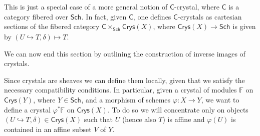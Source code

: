 \begin{rem}[]
	This is just a special case of a more general notion 
	of $\mathsf{C}$-crystal, where $\mathsf{C}$ is a category fibered over $\mathsf{Sch}_{  }$.
	In fact, given $\mathsf{C}$, one defines $\mathsf{C}$-crystals as cartesian
	sections of the fibered category $\mathsf{C} \times_{ \mathsf{Sch}_{  } } \mathsf{Crys}(X)$,
	where $\mathsf{Crys}(X) \to \mathsf{Sch}_{  }$ is given by
	$\left(U \hookrightarrow T, \delta\right) \mapsto T$.
\end{rem}


\noindent
We can now end this section by outlining the construction
of inverse images of crystals.


\begin{rem}[]
	Since crystals are sheaves we can define them locally,
	given that we satisfy the necessary compatibility conditions.
	In particular, given a crystal of modules $\mathbb{F}$ on $\mathsf{Crys}(Y)$,
	where $Y \in \mathsf{Sch}_{  }$, and a morphism of schemes
	$\varphi\colon X \to Y$, we want to define a crystal $\varphi^* \mathbb{F}$
	on $\mathsf{Crys}(X)$.
	To do so we will concentrate only on objects $\left(U \hookrightarrow T, \delta\right)
	\in \mathsf{Crys}(X)$ such that $U$ (hence also $T$)
	is affine and
	$\varphi(U)$ is contained in an affine subset $V$ of $Y$.
\end{rem}


